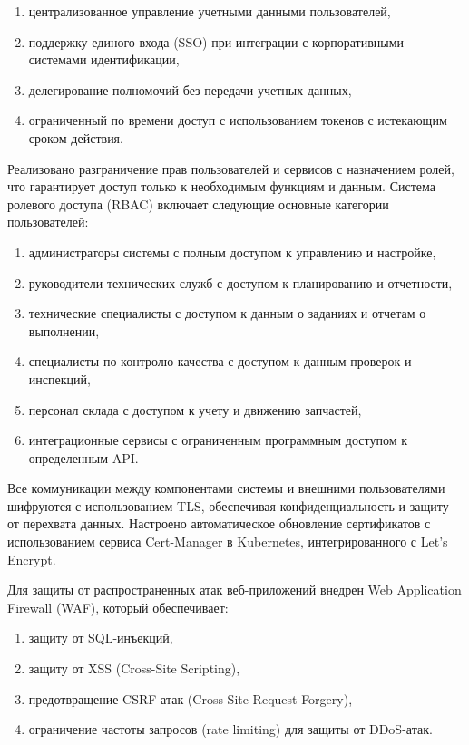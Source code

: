\documentclass[14pt,a4paper]{extarticle}
\begin{document}
\begin{enumerate}
\item централизованное управление учетными данными пользователей,
\item поддержку единого входа (SSO) при интеграции с корпоративными системами идентификации,
\item делегирование полномочий без передачи учетных данных,
\item ограниченный по времени доступ с использованием токенов с истекающим сроком действия.
\end{enumerate}

Реализовано разграничение прав пользователей и сервисов с назначением ролей, что гарантирует доступ только к необходимым функциям и данным. Система ролевого доступа (RBAC) включает следующие основные категории пользователей:

\begin{enumerate}
\item администраторы системы с полным доступом к управлению и настройке,
\item руководители технических служб с доступом к планированию и отчетности,
\item технические специалисты с доступом к данным о заданиях и отчетам о выполнении,
\item специалисты по контролю качества с доступом к данным проверок и инспекций,
\item персонал склада с доступом к учету и движению запчастей,
\item интеграционные сервисы с ограниченным программным доступом к определенным API.
\end{enumerate}

Все коммуникации между компонентами системы и внешними пользователями шифруются с использованием TLS, обеспечивая конфиденциальность и защиту от перехвата данных. Настроено автоматическое обновление сертификатов с использованием сервиса Cert-Manager в Kubernetes, интегрированного с Let's Encrypt.

Для защиты от распространенных атак веб-приложений внедрен Web Application Firewall (WAF), который обеспечивает:

\begin{enumerate}
\item защиту от SQL-инъекций,
\item защиту от XSS (Cross-Site Scripting),
\item предотвращение CSRF-атак (Cross-Site Request Forgery),
\item ограничение частоты запросов (rate limiting) для защиты от DDoS-атак.
\end{enumerate}
\end{document}
